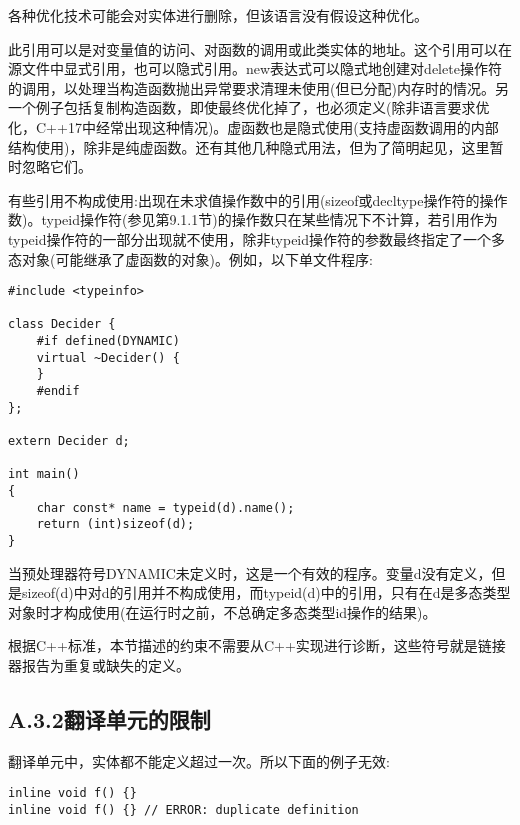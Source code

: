 \begin{tcolorbox}[colback=webgreen!5!white,colframe=webgreen!75!black]
\hspace*{0.75cm}各种优化技术可能会对实体进行删除，但该语言没有假设这种优化。
\end{tcolorbox}

此引用可以是对变量值的访问、对函数的调用或此类实体的地址。这个引用可以在源文件中显式引用，也可以隐式引用。new表达式可以隐式地创建对delete操作符的调用，以处理当构造函数抛出异常要求清理未使用(但已分配)内存时的情况。另一个例子包括复制构造函数，即使最终优化掉了，也必须定义(除非语言要求优化，C++17中经常出现这种情况)。虚函数也是隐式使用(支持虚函数调用的内部结构使用)，除非是纯虚函数。还有其他几种隐式用法，但为了简明起见，这里暂时忽略它们。

有些引用不构成使用:出现在未求值操作数中的引用(sizeof或decltype操作符的操作数)。typeid操作符(参见第9.1.1节)的操作数只在某些情况下不计算，若引用作为typeid操作符的一部分出现就不使用，除非typeid操作符的参数最终指定了一个多态对象(可能继承了虚函数的对象)。例如，以下单文件程序:

\begin{lstlisting}[style=styleCXX]
#include <typeinfo>

class Decider {
	#if defined(DYNAMIC)
	virtual ~Decider() {
	}
	#endif
};

extern Decider d;

int main()
{
	char const* name = typeid(d).name();
	return (int)sizeof(d);
}
\end{lstlisting}

当预处理器符号DYNAMIC未定义时，这是一个有效的程序。变量d没有定义，但是sizeof(d)中对d的引用并不构成使用，而typeid(d)中的引用，只有在d是多态类型对象时才构成使用(在运行时之前，不总确定多态类型id操作的结果)。

根据C++标准，本节描述的约束不需要从C++实现进行诊断，这些符号就是链接器报告为重复或缺失的定义。

\subsection{A.3.2\hspace{0.2cm}翻译单元的限制}

翻译单元中，实体都不能定义超过一次。所以下面的例子无效:

\begin{lstlisting}[style=styleCXX]
inline void f() {}
inline void f() {} // ERROR: duplicate definition
\end{lstlisting}

